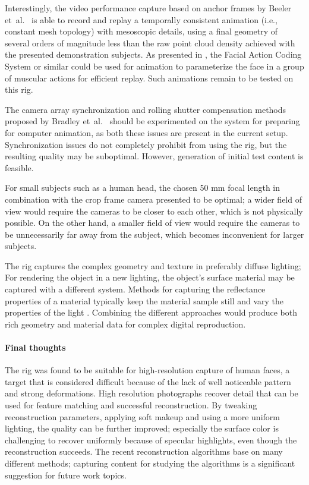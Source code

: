 Interestingly, the video performance capture based on anchor frames by Beeler et~al.\ \cite{beeler2011high} is able to record and replay a temporally consistent animation (i.e., constant mesh topology) with mesoscopic details, using a final geometry of several orders of magnitude less than the raw point cloud density achieved with the presented demonstration subjects.
As presented in \cite{deng2007computer}, the Facial Action Coding System or similar could be used for animation to parameterize the face in a group of muscular actions for efficient replay.
Such animations remain to be tested on this rig.

The camera array synchronization and rolling shutter compensation methods proposed by Bradley et~al.\ \cite{bradley2009synchronization} should be experimented on the system for preparing for computer animation, as both these issues are present in the current setup.
Synchronization issues do not completely prohibit from using the rig, but the resulting quality may be suboptimal.
However, generation of initial test content is feasible.

For small subjects such as a human head, the chosen 50 mm focal length in combination with the crop frame camera presented to be optimal; a wider field of view would require the cameras to be closer to each other, which is not physically possible.
On the other hand, a smaller field of view would require the cameras to be unnecessarily far away from the subject, which becomes inconvenient for larger subjects.

The rig captures the complex geometry and texture in preferably diffuse lighting;
For rendering the object in a new lighting, the object's surface material may be captured with a different system.
Methods for capturing the reflectance properties of a material typically keep the material sample still and vary the properties of the light \cite{debevec2000acquiring} \cite{aittala2013practical}.
Combining the different approaches would produce both rich geometry and material data for complex digital reproduction.

\paragraph{Final thoughts}
The rig was found to be suitable for high-resolution capture of human faces, a target that is considered difficult because of the lack of well noticeable pattern and strong deformations.
High resolution photographs recover detail that can be used for feature matching and successful reconstruction.
By tweaking reconstruction parameters, applying soft makeup and using a more uniform lighting, the quality can be further improved;
especially the surface color is challenging to recover uniformly because of specular highlights, even though the reconstruction succeeds.
The recent reconstruction algorithms base on many different methods; capturing content for studying the algorithms is a significant suggestion for future work topics.

